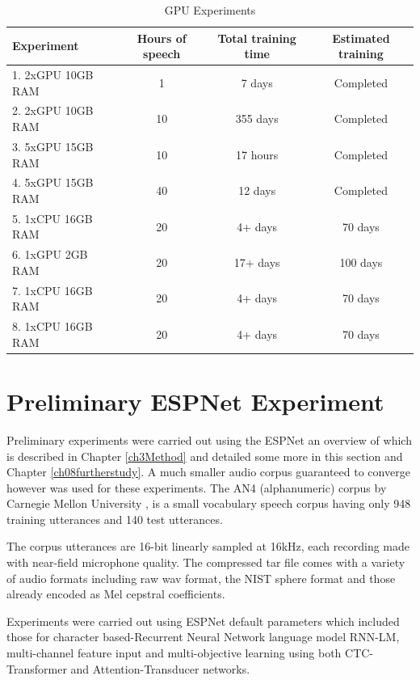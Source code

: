 \begin{table}
  \caption{GPU Experiments}
  \label{tab_c6_01_training}
\begin{tabular}{lccc}
\toprule
Experiment & Hours of speech & Total training time & Estimated training\\
\midrule
1. 2xGPU 10GB RAM & 1 & 7 days & Completed\\
2. 2xGPU 10GB RAM & 10 & 355 days & Completed\\
3. 5xGPU 15GB RAM & 10 & 17 hours & Completed\\
4. 5xGPU 15GB RAM & 40 & 12 days & Completed\\
5. 1xCPU 16GB RAM & 20 & 4+ days & 70 days\\
6. 1xGPU 2GB RAM & 20 & 17+ days & 100 days\\
7. 1xCPU 16GB RAM & 20 & 4+ days & 70 days\\
8. 1xCPU 16GB RAM & 20 & 4+ days & 70 days\\
\bottomrule
\end{tabular}
\end{table}
\section{Preliminary ESPNet Experiment}
Preliminary experiments were carried out using the ESPNet \citep{watanabe2018espnet} an overview of which is described in Chapter \ref{ch3Method} and detailed some more in this section and Chapter \ref{ch08furtherstudy}.  A much smaller audio corpus guaranteed to converge however was used for these experiments.  The AN4 (alphanumeric) corpus by Carnegie Mellon University \citep{acero1990acoustical}, is a small vocabulary speech corpus having only 948 training utterances and 140 test utterances.

The corpus utterances are 16-bit linearly sampled at 16kHz, each recording made with near-field microphone quality.  The compressed tar file comes with a variety of audio formats including raw wav format, the NIST sphere format and those already encoded as Mel cepstral coefficients.

Experiments were carried out using ESPNet default parameters which included those for character based-Recurrent Neural Network language model RNN-LM, multi-channel feature input and multi-objective learning using both CTC-Transformer and Attention-Transducer networks.

